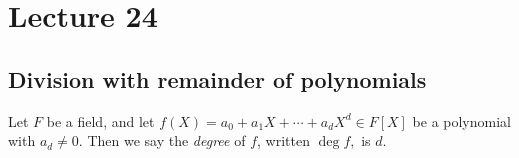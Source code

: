 \section{Lecture 24}
\subsection{Division with remainder of polynomials}

\begin{definition}
  Let $F$ be a field, and let $f(X)=a_0+a_1X+\cdots + a_d X^d\in F[X]$ be a polynomial
  with $a_d\neq 0$. Then we say the \emph{degree} of $f$, written $\deg f,$ is $d$.
  \label{<+label+>}
\end{definition}

  
